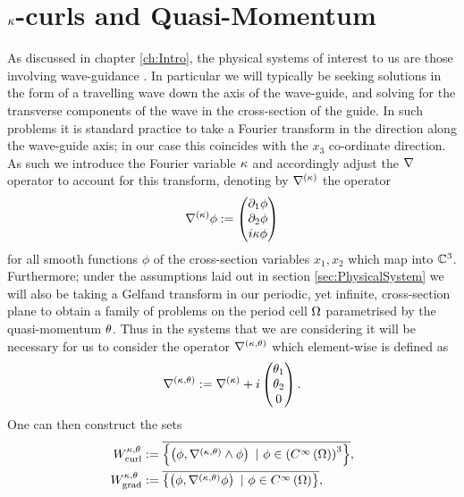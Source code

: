 \section{$\kappa$-curls and Quasi-Momentum} \label{sec:kCurlsAndQM}
As discussed in chapter \ref{ch:Intro}, the physical systems of interest to us are those involving wave-guidance .
In particular we will typically be seeking solutions in the form of a travelling wave down the axis of the wave-guide, and solving for the transverse components of the wave in the cross-section of the guide.
In such problems it is standard practice to take a Fourier transform in the direction along the wave-guide axis; in our case this coincides with the $x_3$ co-ordinate direction.
As such we introduce the Fourier variable $\kappa$ and accordingly adjust the $\nabla$ operator to account for this transform, denoting by $\nabla^{(\kappa)}$ the operator
\begin{align*}
	\nabla^{(\kappa)}\phi := \begin{pmatrix} \partial_1\phi \\ \partial_2\phi \\ i\kappa\phi\end{pmatrix}
\end{align*}
for all smooth functions $\phi$ of the cross-section variables $x_1,x_2$ which map into $\mathbb{C}^3$.
Furthermore; under the assumptions laid out in section \ref{sec:PhysicalSystem}  we will also be taking a Gelfand transform in our periodic, yet infinite, cross-section plane to obtain a family of problems on the period cell $\Omega$ parametrised by the quasi-momentum $\theta$.
Thus in the systems that we are considering it will be necessary for us to consider the operator $\nabla^{\left( \kappa, \theta \right)}$ which element-wise is defined as
\begin{align*}
	\nabla^{\left( \kappa, \theta \right)} := \nabla^{(\kappa)} + i\begin{pmatrix} \theta_1 \\ \theta_2 \\ 0 \end{pmatrix}.
\end{align*}
One can then construct the sets
\begin{subequations} \label{eq:WktDefinitions}
	\begin{align}
		W^{\wavenumber, \qm}_{\mathrm{curl}} &:= \overline{ \clbracs{ \bracs{\phi, \ktcurl{}\phi} \ \vert \ \phi\in\bracs{\smooth{\ddom}}^3 } }, \\
		W^{\wavenumber, \qm}_{\mathrm{grad}} &:= \overline{ \clbracs{ \bracs{\phi, \ktgrad\phi} \ \vert \ \phi\in\smooth{\ddom} } },
	\end{align}
\end{subequations}
